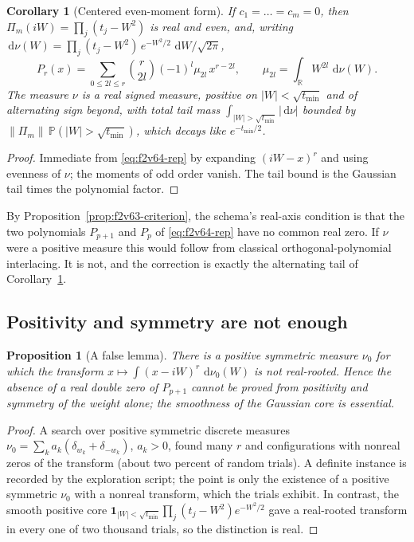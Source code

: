 \documentclass[11pt]{article}
\newtheorem{proposition}[theorem]{Proposition}
\newtheorem{corollary}[theorem]{Corollary}
\theoremstyle{definition}
\theoremstyle{remark}
\newcommand{\dd}{\,\mathrm d}
\begin{document}
\begin{corollary}[Centered even-moment form]
\label{cor:f2v64-centered}
If \(c_1=\dots=c_m=0\), then \(\Pi_m(iW)=\prod_j(t_j-W^2)\) is real and
even, and, writing \(\dd\nu(W)=\prod_j(t_j-W^2)\,e^{-W^2/2}\,\dd W/\sqrt{2\pi}\),
\begin{equation}
 P_r(x)=\sum_{0\le 2l\le r}\binom{r}{2l}(-1)^l\mu_{2l}\,x^{r-2l},
 \qquad \mu_{2l}=\int_{\mathbb R}W^{2l}\,\dd\nu(W).
 \label{eq:f2v64-centered}
\end{equation}
The measure \(\nu\) is a real signed measure, positive on
\(|W|<\sqrt{t_{\min}}\) and of alternating sign beyond, with total tail
mass \(\int_{|W|>\sqrt{t_{\min}}}|\dd\nu|\) bounded by
\(\|\Pi_m\|\,\mathbb P(|W|>\sqrt{t_{\min}})\), which decays like
\(e^{-t_{\min}/2}\).
\end{corollary}

\begin{proof}
Immediate from \eqref{eq:f2v64-rep} by expanding \((iW-x)^r\) and
using evenness of \(\nu\); the moments of odd order vanish.  The tail
bound is the Gaussian tail times the polynomial factor.
\end{proof}

By Proposition~\ref{prop:f2v63-criterion}, the schema's real-axis
condition is that the two polynomials \(P_{p+1}\) and \(P_p\) of
\eqref{eq:f2v64-rep} have no common real zero.  If \(\nu\) were a
positive measure this would follow from classical orthogonal-polynomial
interlacing.  It is not, and the correction is exactly the alternating
tail of Corollary~\ref{cor:f2v64-centered}.

\subsection{Positivity and symmetry are not enough}

\begin{proposition}[A false lemma]
\label{prop:f2v64-false}
There is a positive symmetric measure \(\nu_0\) for which the transform
\(x\mapsto\int(x-iW)^r\,\dd\nu_0(W)\) is not real-rooted.  Hence the
absence of a real double zero of \(P_{p+1}\) cannot be proved from
positivity and symmetry of the weight alone; the smoothness of the
Gaussian core is essential.
\end{proposition}

\begin{proof}
A search over positive symmetric discrete measures
\(\nu_0=\sum_k a_k(\delta_{w_k}+\delta_{-w_k})\), \(a_k>0\), found many
\(r\) and configurations with nonreal zeros of the transform (about two
percent of random trials).  A definite instance is recorded by the
exploration script; the point is only the existence of a positive
symmetric \(\nu_0\) with a nonreal transform, which the trials exhibit.
In contrast, the smooth positive core
\(\mathbf 1_{|W|<\sqrt{t_{\min}}}\prod_j(t_j-W^2)e^{-W^2/2}\) gave a
real-rooted transform in every one of two thousand trials, so the
distinction is real.
\end{proof}
\end{document}
